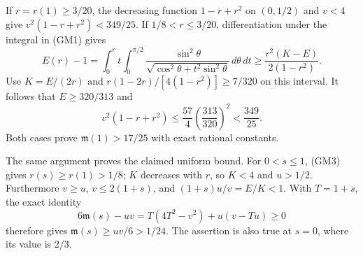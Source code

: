 \documentclass[11pt]{article}
\newcommand{\dd}{\,d}\newcommand{\R}{\mathbb R}
\begin{document}
If $r=r(1)\ge3/20$, the decreasing function $1-r+r^2$ on $(0,1/2)$
and $v<4$ give $v^2(1-r+r^2)<349/25$.
If $1/8<r\le3/20$, differentiation under the integral in (GM1) gives
\begin{equation}\tag{GM19}
 E(r)-1=\int_0^r t\int_0^{\pi/2}
 \frac{\sin^2\theta}{\sqrt{\cos^2\theta+t^2\sin^2\theta}}
 \dd\theta\dd t
 \ge\frac{r^2(K-E)}{2(1-r^2)}.
\end{equation}
Use $K=E/(2r)$ and
$r(1-2r)/[4(1-r^2)]\ge7/320$ on this interval.
It follows that $E\ge320/313$ and
\[
 v^2(1-r+r^2)\le\frac{57}{4}\left(\frac{313}{320}\right)^2
 <\frac{349}{25}.
\]
Both cases prove $\mathfrak m(1)>17/25$ with exact rational constants.

The same argument proves the claimed uniform bound. For $0<s\le1$,
(GM3) gives $r(s)\ge r(1)>1/8$; $K$ decreases with $r$, so $K<4$
and $u>1/2$. Furthermore $v\ge u$, $v\le2(1+s)$, and
$(1+s)u/v=E/K<1$. With $T=1+s$, the exact identity
\begin{equation}\tag{GM20}
 6\mathfrak m(s)-uv=T(4T^2-v^2)+u(v-Tu)\ge0
\end{equation}
therefore gives $\mathfrak m(s)\ge uv/6>1/24$. The assertion is also
true at $s=0$, where its value is $2/3$.
\end{document}
